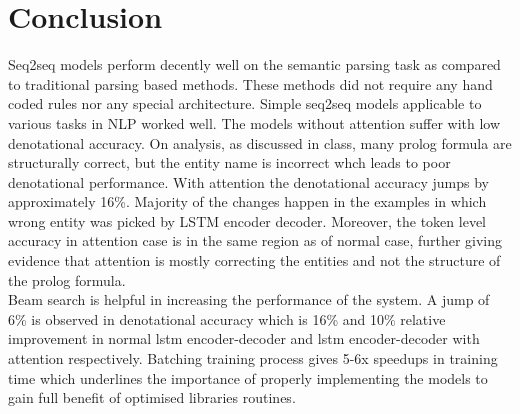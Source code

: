 \documentclass[11pt,a4paper]{article}
\begin{document}
\section{Conclusion}
Seq2seq models perform decently well on the semantic parsing task as compared to traditional parsing based methods. These methods did not require any hand coded rules nor any special architecture. Simple seq2seq models applicable to various tasks in NLP worked well. The models without attention suffer with low denotational accuracy. On analysis, as discussed in class, many prolog formula are structurally correct, but the entity name is incorrect whch leads to poor denotational performance. With attention the denotational accuracy jumps by approximately 16\%. Majority of the changes happen in the examples in which wrong entity was picked by LSTM encoder decoder. Moreover, the token level accuracy in attention case is in the same region as of normal case, further giving evidence that attention is mostly correcting the entities and not the structure of the prolog formula.\\
Beam search is helpful in increasing the performance of the system. A jump of 6\% is observed in denotational accuracy which is 16\% and 10\% relative improvement in normal lstm encoder-decoder and lstm encoder-decoder with attention respectively. Batching training process gives 5-6x speedups in training time which underlines the importance of properly implementing the models to gain full benefit of optimised libraries routines.
\nocite{*}


\end{document}
